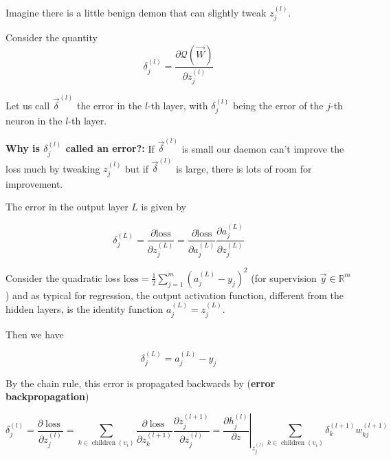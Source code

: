 Imagine there is a little benign demon that can slightly tweak $z_j^{(l)}$.

Consider the quantity
\begin{equation}
    \delta_j^{(l)} = \frac{\partial \mathcal{Q}(\vec{W})}{\partial z_j^{(l)}}
\end{equation}

Let us call $\vec{\delta}^{(l)}$ the error in the $l$-th layer, with $\delta_j^{(l)}$
being the error of the $j$-th neuron in the $l$-th layer.

\textbf{Why is $\delta_j^{(l)}$ called an error?:} If $\vec{\delta}^{(l)}$ is small 
our daemon can't improve the loss much by tweaking $z_j^{(l)}$ but if $\vec{\delta}^{(l)}$ is large,
there is lots of room for improvement.

The error in the output layer $L$ is given by

\begin{equation}
    \delta_j^{(L)} = \frac{\partial \text{loss}}{\partial z_j^{(L)}} = \frac{\partial \text{loss}}{\partial a_j^{(L)}} \frac{\partial a_j^{(L)}}{\partial z_j^{(L)}}
\end{equation}

Consider the quadratic loss $\text{loss} = \frac{1}{2} \sum_{j=1}^{m} \left( a_j^{(L)} - y_j \right)^2$ 
(for supervision $\vec{y} \in \mathbb{R}^m$) and as typical for regression, the output activation
function, different from the hidden layers, is the identity function $a_j^{(L)} = z_j^{(L)}$.

Then we have

\begin{equation}
    \delta_j^{(L)} = a_j^{(L)} - y_j
\end{equation}


By the chain rule, this error is propagated backwards by (\textbf{error backpropagation})

\begin{equation}
    \delta_j^{(l)}=\frac{\partial \operatorname{loss}}{\partial z_j^{(l)}}=\sum_{k \in \operatorname{children}\left(v_i\right)} \frac{\partial \operatorname{loss}}{\partial z_k^{(l+1)}} \frac{\partial z_j^{(l+1)}}{\partial z_j^{(l)}}=\left.\frac{\partial h_j^{(l)}}{\partial z}\right|_{z_j^{(l)}} \sum_{k \in \operatorname{children}\left(v_i\right)} \delta_k^{(l+1)} w_{k j}^{(l+1)}
\end{equation}

